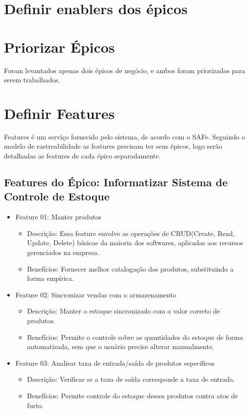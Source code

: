 \section{Definir enablers dos épicos}

\section{Priorizar Épicos}
Foram levantados apenas dois épicos de negócio, e ambos foram priorizados para serem trabalhados.

\section{Definir Features}
Features é um serviço fornecido pelo sistema, de acordo com o SAFe. Seguindo o modelo de rastreabilidade as features precisam ter seus épicos, logo serão detalhadas as features de cada épico separadamente.

\subsection{Features do Épico: Informatizar Sistema de Controle de Estoque}

\begin{itemize}
\item Feature 01: Manter produtos
\begin{itemize}
\item Descrição: Essa feature envolve as operações de CRUD(Create, Read, Update, Delete) básicas da maioria dos softwares, aplicadas aos recursos gerenciados na empresa.
\item Benefícios: Fornecer melhor catalogação dos produtos, substituindo a forma empírica.
\end{itemize}

\item Feature 02: Sincronizar vendas com o armazenamento
\begin{itemize}
    \item Descrição: Manter o estoque sincronizado com o valor correto de produtos.
    \item Benefícios: Permite o controle sobre as quantidades do estoque de forma automatizada, sem que o usuário precise alterar manualmente.
\end{itemize}


\item Feature 03: Analisar taxa de entrada/saída de produtos específicos
\begin{itemize}
	\item Descrição: Verificar se a taxa de saída corresponde a taxa de entrada.
	\item Benefícios: Permite controle do estoque desses produtos contra atos de furto.
\end{itemize}

\end{itemize}	

